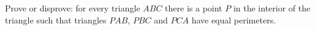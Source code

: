 Prove or disprove: for every triangle $ABC$ there is a point $P$ in the interior of the triangle such that triangles $PAB$, $PBC$ and $PCA$ have equal perimeters.
